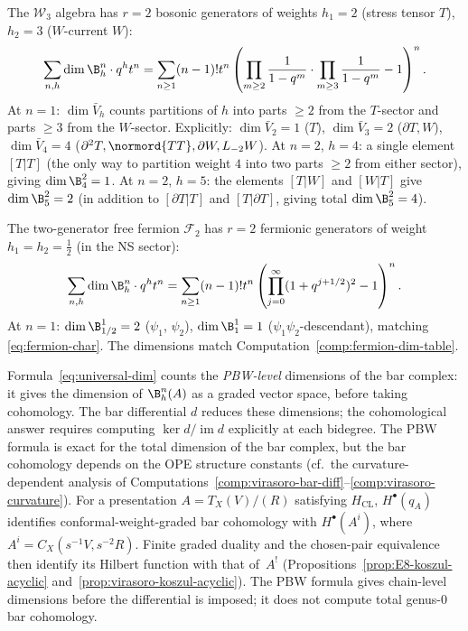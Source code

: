 \begin{computation}\label{comp:dim-formula-w3}
The $\mathcal{W}_3$ algebra has $r = 2$ bosonic generators of weights
$h_1 = 2$ (stress tensor $T$), $h_2 = 3$ ($W$-current $W$):
\[
\sum_{n,h} \dim \B^n_h \cdot q^h t^n
= \sum_{n\ge1}(n-1)!t^n
\left(
\prod_{m \geq 2} \frac{1}{1 - q^m}
\cdot \prod_{m \geq 3} \frac{1}{1 - q^m} - 1
\right)^n .
\]
At $n = 1$: $\dim \bar{V}_h$ counts partitions of $h$ into parts
$\geq 2$ from the $T$-sector and parts $\geq 3$ from the $W$-sector.
Explicitly: $\dim \bar{V}_2 = 1$ ($T$), $\dim \bar{V}_3 = 2$
($\partial T, W$), $\dim \bar{V}_4 = 4$
($\partial^2 T, \normord{TT}, \partial W, L_{-2}W$).
At $n = 2$, $h = 4$: a single element $[T|T]$ (the only way to
partition weight $4$ into two parts $\geq 2$ from either sector),
giving $\dim \B^2_4 = 1$.
At $n = 2$, $h = 5$: the elements $[T|W]$ and $[W|T]$ give
$\dim \B^2_5 = 2$ (in addition to $[\partial T | T]$ and $[T|\partial T]$,
giving total $\dim \B^2_5 = 4$).
\end{computation}

\begin{computation}
\label{comp:dim-formula-fermion}
The two-generator free fermion $\mathcal{F}_2$ has $r = 2$ fermionic
generators of weight $h_1 = h_2 = \tfrac{1}{2}$ (in the NS sector):
\[
\sum_{n,h} \dim \B^n_h \cdot q^h t^n
= \sum_{n\ge1}(n-1)!t^n
\left(\prod_{j=0}^{\infty}(1+q^{j+1/2})^2-1\right)^n .
\]
At $n = 1$: $\dim \B^1_{1/2} = 2$ ($\psi_1$, $\psi_2$),
$\dim \B^1_1 = 1$ ($\psi_1 \psi_2$-descendant), matching
\eqref{eq:fermion-char}.
The dimensions match Computation~\ref{comp:fermion-dim-table}.
\end{computation}

\begin{remark}\label{rem:PBW-approximation}
Formula~\eqref{eq:universal-dim} counts the
\emph{PBW-level} dimensions of the bar complex: it gives
the dimension of $\B^n_h(A)$ as a graded vector space, before
taking cohomology. The bar differential $d$ reduces these
dimensions; the cohomological answer requires computing
$\ker d / \operatorname{im} d$ explicitly at each bidegree.
The PBW formula is exact for the total dimension of the bar complex,
but the bar cohomology depends on the OPE structure constants
(cf.\ the curvature-dependent analysis of
Computations~\ref{comp:virasoro-bar-diff}--\ref{comp:virasoro-curvature}).
For a presentation $A=T_X(V)/(R)$ satisfying $H_{\mathrm{CL}}$,
$H^\bullet(q_A)$ identifies conformal-weight-graded bar cohomology
with $H^\bullet(A^i)$, where
$A^i=C_X(s^{-1}V,s^{-2}R)$.  Finite graded duality and the
chosen-pair equivalence then identify its Hilbert function with that
of~$A^!$
(Propositions~\ref{prop:E8-koszul-acyclic}
and~\ref{prop:virasoro-koszul-acyclic}). The PBW formula gives
chain-level dimensions before the differential is imposed; it does
not compute total genus-$0$ bar cohomology.
\end{remark}

